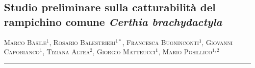 \setcounter{figure}{0}
\setcounter{table}{0}

\begin{adjustwidth}{-3.5cm}{0cm}
\pagestyle{CIOpage}
\chapter*[Catturabilit\`a del rampichino comune]{
\textbf{Studio preliminare sulla catturabilit\`a del rampichino comune
}\textbf{\textit{Certhia brachydactyla}}}


\textsc{Marco Basile}$^{1}$, \textsc{Rosario Balestrieri}$^{1*}$,
\textsc{Francesca Buoninconti}$^{1}$, \textsc{Giovanni Capobianco}$^{1}$,
 \textsc{Tiziana Altea}$^{2}$, \textsc{Giorgio Matteucci}$^{1}$,
\textsc{Mario Posillico}$^{1,2}$ \\

      
\noindent\color{MUSEBLUE}\rule{27cm}{2pt}
\vspace{1cm}
\end{adjustwidth}



